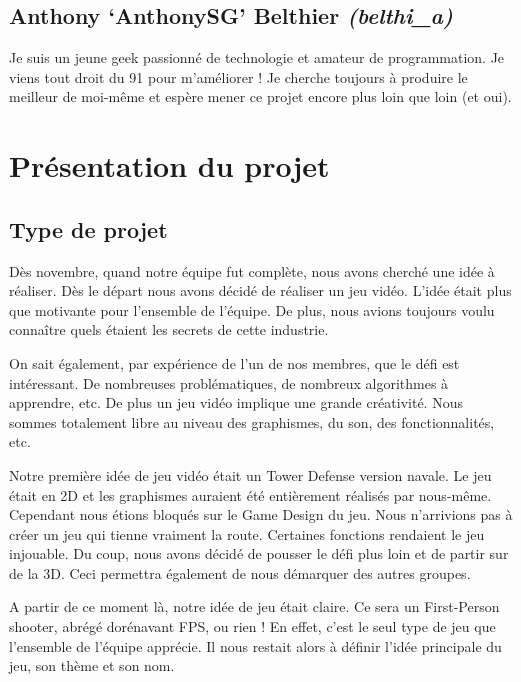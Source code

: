 \documentclass[a4paper, 11pt]{report}
\begin{document}
\subsection{Anthony `AnthonySG' Belthier \emph{(belthi\_a)}}\label{anthony-anthonysg-belthier-belthiux5fa}

Je suis un jeune geek passionné de technologie et amateur de programmation. Je viens tout droit du 91 pour m'améliorer ! Je cherche toujours à produire le meilleur de moi-même et espère mener ce projet encore plus loin que loin (et oui).

\newpage
\section{Présentation du projet}\label{pruxe9sentation-du-projet}

\subsection{Type de projet}\label{type-de-projet}

Dès novembre, quand notre équipe fut complète, nous avons cherché une idée à réaliser. Dès le départ nous avons décidé de réaliser un jeu vidéo. L'idée était plus que motivante pour l'ensemble de l'équipe. De plus, nous avions toujours voulu connaître quels étaient les secrets de cette industrie.

On sait également, par expérience de l'un de nos membres, que le défi est intéressant. De nombreuses problématiques, de nombreux algorithmes à apprendre, etc. De plus un jeu vidéo implique une grande créativité. Nous sommes totalement libre au niveau des graphismes, du son, des fonctionnalités, etc.

Notre première idée de jeu vidéo était un Tower Defense version navale. Le jeu était en 2D et les graphismes auraient été entièrement réalisés par nous-même. Cependant nous étions bloqués sur le Game Design du jeu. Nous n'arrivions pas à créer un jeu qui tienne vraiment la route. Certaines fonctions rendaient le jeu injouable. Du coup, nous avons décidé de pousser le défi plus loin et de partir sur de la 3D. Ceci permettra également de nous démarquer des autres groupes.

A partir de ce moment là, notre idée de jeu était claire. Ce sera un First-Person shooter, abrégé dorénavant FPS, ou rien ! En effet, c'est le seul type de jeu que l'ensemble de l'équipe apprécie. Il nous restait alors à définir l'idée principale du jeu, son thème et son nom.
\end{document}
